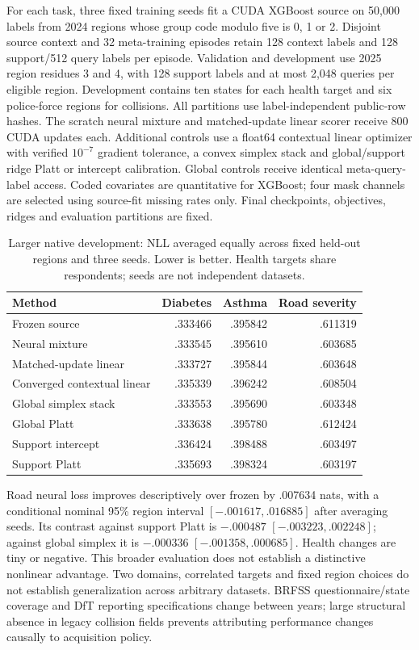 \documentclass[10pt]{article}
\begin{document}
For each task, three fixed training seeds fit a CUDA XGBoost source on 50,000 labels from 2024 regions whose group code modulo five is 0, 1 or 2. Disjoint source context and 32 meta-training episodes retain 128 context labels and 128 support/512 query labels per episode. Validation and development use 2025 region residues 3 and 4, with 128 support labels and at most 2,048 queries per eligible region. Development contains ten states for each health target and six police-force regions for collisions. All partitions use label-independent public-row hashes. The scratch neural mixture and matched-update linear scorer receive 800 CUDA updates each. Additional controls use a float64 contextual linear optimizer with verified $10^{-7}$ gradient tolerance, a convex simplex stack and global/support ridge Platt or intercept calibration. Global controls receive identical meta-query-label access. Coded covariates are quantitative for XGBoost; four mask channels are selected using source-fit missing rates only. Final checkpoints, objectives, ridges and evaluation partitions are fixed.

\begin{table}[t]
\centering\small
\caption{Larger native development: NLL averaged equally across fixed held-out regions and three seeds. Lower is better. Health targets share respondents; seeds are not independent datasets.}
\label{tab:large-native}
\begin{tabular}{lrrr}\toprule
Method & Diabetes & Asthma & Road severity\\\midrule
Frozen source & .333466 & .395842 & .611319\\
Neural mixture & .333545 & .395610 & .603685\\
Matched-update linear & .333727 & .395844 & .603648\\
Converged contextual linear & .335339 & .396242 & .608504\\
Global simplex stack & .333553 & .395690 & .603348\\
Global Platt & .333638 & .395780 & .612424\\
Support intercept & .336424 & .398488 & .603497\\
Support Platt & .335693 & .398324 & .603197\\\bottomrule
\end{tabular}
\end{table}

Road neural loss improves descriptively over frozen by .007634 nats, with a conditional nominal 95\% region interval $[-.001617,.016885]$ after averaging seeds. Its contrast against support Platt is $-.000487$ $[-.003223,.002248]$; against global simplex it is $-.000336$ $[-.001358,.000685]$. Health changes are tiny or negative. This broader evaluation does not establish a distinctive nonlinear advantage. Two domains, correlated targets and fixed region choices do not establish generalization across arbitrary datasets. BRFSS questionnaire/state coverage and DfT reporting specifications change between years; large structural absence in legacy collision fields prevents attributing performance changes causally to acquisition policy.
\end{document}
